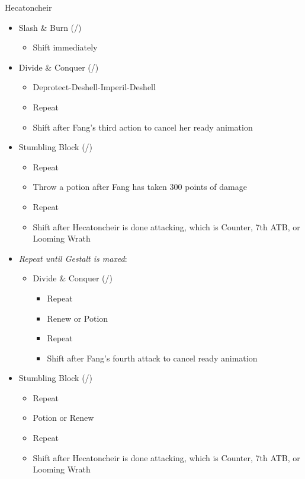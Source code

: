 \documentclass{report}
\begin{document}
\renewcommand{\first}{[1] Slash \& Burn (\rav/\com)}
\renewcommand{\third}{[3] Divide \& Conquer (\sab/\com)}
\renewcommand{\fourth}{[4] Stumbling Block (\sab/\sen)}
\begin{battle}{Hecatoncheir}
\begin{itemize}
    \item \first
    \begin{itemize}
        \item Shift immediately
    \end{itemize}
    \item \third
    \begin{itemize}
        \item Deprotect-Deshell-Imperil-Deshell
        \item Repeat
        \item Shift after Fang's third action to cancel her ready animation
    \end{itemize}
    \item \fourth
    \begin{itemize}
        \item Repeat
        \item Throw a potion after Fang has taken 300 points of damage
        \item Repeat
        \item Shift after Hecatoncheir is done attacking, which is Counter, 7th ATB, or Looming Wrath
    \end{itemize}
    \item \textit{Repeat until Gestalt is maxed}:
    \begin{itemize}
        \item \third
        \begin{itemize}
            \item Repeat
            \item Renew or Potion
            \item Repeat
            \item Shift after Fang's fourth attack to cancel ready animation
        \end{itemize}
    \end{itemize}
    \item \fourth
    \begin{itemize}
        \item Repeat
        \item Potion or Renew
        \item Repeat
        \item Shift after Hecatoncheir is done attacking, which is Counter, 7th ATB, or Looming Wrath
    \end{itemize}
\end{itemize}
\end{battle}
\end{document}
